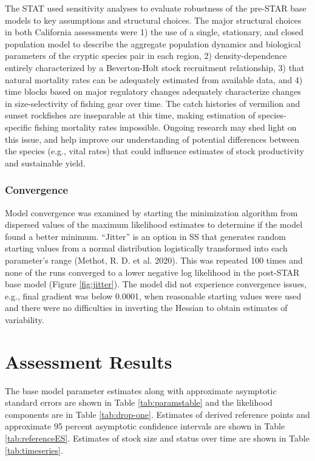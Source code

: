 \documentclass[
  english,
  a4paper,
]{article}
\begin{document}
The STAT used sensitivity analyses to evaluate robustness of the pre-STAR base models to key assumptions and structural choices. The major structural choices in both California assessments were 1) the use of a single, stationary, and closed population model to describe the aggregate population dynamics and biological parameters of the cryptic species pair in each region, 2) density-dependence entirely characterized by a Beverton-Holt stock recruitment relationship, 3) that natural mortality rates can be adequately estimated from available data, and 4) time blocks based on major regulatory changes adequately characterize changes in size-selectivity of fishing gear over time. The catch histories of vermilion and sunset rockfishes are inseparable at this time, making estimation of species-specific fishing mortality rates impossible. Ongoing research may shed light on this issue, and help improve our understanding of potential differences between the species (e.g., vital rates) that could influence estimates of stock productivity and sustainable yield.

\hypertarget{convergence}{%
\subsubsection{Convergence}\label{convergence}}

Model convergence was examined by starting the minimization algorithm from dispersed
values of the maximum likelihood estimates to determine if the model found a better
minimum. ``Jitter'' is an option in SS that generates random starting values from a normal
distribution logistically transformed into each parameter's range (Methot, R. D. et al. 2020). This
was repeated 100 times and none of the runs converged to a lower negative log likelihood
in the post-STAR base model (Figure \ref{fig:jitter}).
The model did not experience convergence issues, e.g., final gradient was below 0.0001,
when reasonable starting values were used and there were no difficulties in inverting
the Hessian to obtain estimates of variability.

\hypertarget{assessment-results}{%
\section{Assessment Results}\label{assessment-results}}

The base model parameter estimates along with approximate asymptotic standard errors are shown in Table \ref{tab:paramstable} and the likelihood components are in Table \ref{tab:drop-one}. Estimates of derived reference points and approximate 95 percent asymptotic confidence intervals are shown in Table \ref{tab:referenceES}. Estimates of stock size and status over time are shown in Table \ref{tab:timeseries}.
\end{document}
